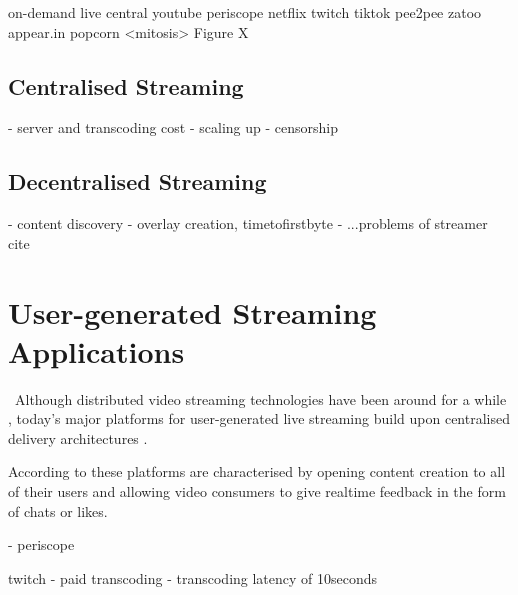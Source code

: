         on-demand       live
central youtube         periscope         
        netflix         twitch
        tiktok
pee2pee zatoo           appear.in
        popcorn         <mitosis>
Figure X

\subsection{Centralised Streaming}

- server and transcoding cost
- scaling up
- censorship

\subsection{Decentralised Streaming}

- content discovery
- overlay creation, timetofirstbyte
- ...problems of streamer cite

\section{User-generated Streaming Applications}

~Although distributed video streaming technologies have been around for a while \cite{TODO}, today's major platforms for user-generated live streaming build upon centralised delivery architectures \cite{periscope, twitch, facebook-live}.~

According to \citet{twitch-case} these platforms are characterised by opening content creation to all of their users and allowing video consumers to give realtime feedback in the form of chats or likes.

- periscope

twitch
- paid transcoding \cite[\S2]{twitch-study}
- transcoding latency of 10seconds \cite[\S4.2]{twitch-study}
